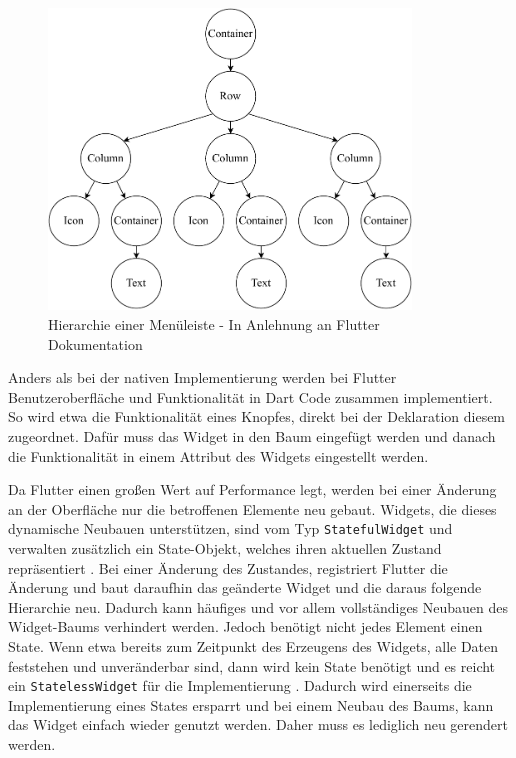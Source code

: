\begin{figure}[ht]
  \centering
  \includegraphics[height=8cm,keepaspectratio]{images/Flutter_menu_replacement.drawio.pdf} 
  \caption[Hierarchie einer Menüleiste]{Hierarchie einer Menüleiste - In Anlehnung an Flutter Dokumentation\protect\footnotemark}
  \label{fig:flutter_layout_tree}
\end{figure}

Anders als bei der nativen Implementierung werden bei Flutter Benutzeroberfläche und Funktionalität in Dart Code zusammen implementiert. So wird etwa die Funktionalität eines Knopfes, direkt bei der Deklaration diesem zugeordnet. Dafür muss das Widget in den Baum eingefügt werden und danach die Funktionalität in einem Attribut des Widgets eingestellt werden.

Da Flutter einen großen Wert auf Performance legt, werden bei einer Änderung an der Oberfläche nur die betroffenen Elemente neu gebaut. Widgets, die dieses dynamische Neubauen unterstützen, sind vom Typ \verb|StatefulWidget| und verwalten zusätzlich ein State-Objekt, welches ihren aktuellen Zustand repräsentiert \cite[Kapitel~4]{Flutter_Recipes}. Bei einer Änderung des Zustandes, registriert Flutter die Änderung und baut daraufhin das geänderte Widget und die daraus folgende Hierarchie neu\cite{9623025}. Dadurch kann häufiges und vor allem vollständiges Neubauen des Widget-Baums verhindert werden. Jedoch benötigt nicht jedes Element einen State. Wenn etwa bereits zum Zeitpunkt des Erzeugens des Widgets, alle Daten feststehen und unveränderbar sind, dann wird kein State benötigt und es reicht ein \verb|StatelessWidget| für die Implementierung \cite[Kapitel~4]{Flutter_Recipes}. Dadurch wird einerseits die Implementierung eines States ersparrt und bei einem Neubau des Baums, kann das Widget einfach wieder genutzt werden. Daher muss es lediglich neu gerendert werden.

